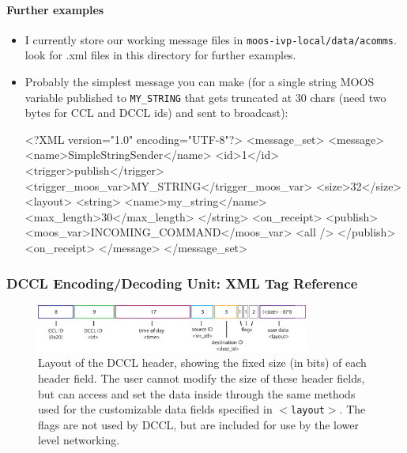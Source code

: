 \documentclass[11pt, letterpaper, oneside]{memoir}
\newcommand{\xmltag}[1]{\texttt{$<$#1$>$}}
\begin{document}
\paragraph{Further examples} \label{sec:ex}
\begin{itemize}
\item I currently store our working message files in \verb|moos-ivp-local/data/acomms|. look for .xml files in this directory for further examples.
\item Probably the simplest message you can make (for a single string MOOS variable published to \verb|MY_STRING| that gets truncated at 30 chars (need two bytes for CCL and DCCL ids) and sent to broadcast):
\begin{small}
\begin{boxedverbatim}
<?XML version="1.0" encoding="UTF-8"?>
<message_set>
  <message>
    <name>SimpleStringSender</name>
    <id>1</id>    
    <trigger>publish</trigger>
    <trigger_moos_var>MY_STRING</trigger_moos_var>
    <size>32</size>
    <layout>
      <string>
        <name>my_string</name>
        <max_length>30</max_length>
      </string>
    <on_receipt>
      <publish>
        <moos_var>INCOMING_COMMAND</moos_var>
        <all />
      </publish>
    <on_receipt>
  </message>
</message_set>
\end{boxedverbatim}
\resetbvlinenumber
\end{small}
\end{itemize}


\subsubsection{DCCL Encoding/Decoding Unit: XML Tag Reference}

\begin{figure}
\centering
\includegraphics[width=0.8\textwidth]{dccl-header.eps}
\caption{Layout of the DCCL header, showing the fixed size (in bits) of each header field. The user cannot modify the size of these header fields, but can access and set the data inside through the same methods used for the customizable data fields specified in \xmltag{layout}. The flags are not used by DCCL, but are included for use by the lower level networking.}
\label{fig:header}
\end{figure}
\end{document}
